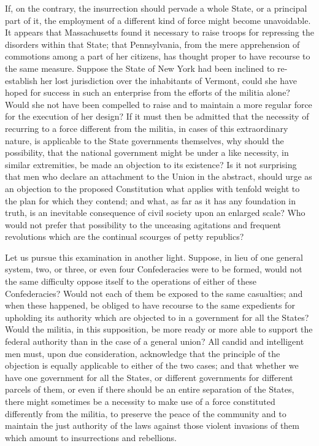 If, on the contrary, the insurrection should pervade a whole State, or a principal part of it, the employment of a different kind of force might become unavoidable. 
It appears that Massachusetts found it necessary to raise troops for repressing the disorders within that State; that Pennsylvania, from the mere apprehension of commotions among a part of her citizens, has thought proper to have recourse to the same measure. 
Suppose the State of New York had been inclined to re-establish her lost jurisdiction over the inhabitants of Vermont, could she have hoped for success in such an enterprise from the efforts of the militia alone? 
Would she not have been compelled to raise and to maintain a more regular force for the execution of her design? 
If it must then be admitted that the necessity of recurring to a force different from the militia, in cases of this extraordinary nature, is applicable to the State governments themselves, why should the possibility, that the national government might be under a like necessity, in similar extremities, be made an objection to its existence? 
Is it not surprising that men who declare an attachment to the Union in the abstract, should urge as an objection to the proposed Constitution what applies with tenfold weight to the plan for which they contend; and what, as far as it has any foundation in truth, is an inevitable consequence of civil society upon an enlarged scale? 
Who would not prefer that possibility to the unceasing agitations and frequent revolutions which are the continual scourges of petty republics?

Let us pursue this examination in another light. 
Suppose, in lieu of one general system, two, or three, or even four Confederacies were to be formed, would not the same difficulty oppose itself to the operations of either of these Confederacies? 
Would not each of them be exposed to the same casualties; and when these happened, be obliged to have recourse to the same expedients for upholding its authority which are objected to in a government for all the States? 
Would the militia, in this supposition, be more ready or more able to support the federal authority than in the case of a general union? 
All candid and intelligent men must, upon due consideration, acknowledge that the principle of the objection is equally applicable to either of the two cases; and that whether we have one government for all the States, or different governments for different parcels of them, or even if there should be an entire separation of the States, there might sometimes be a necessity to make use of a force constituted differently from the militia, to preserve the peace of the community and to maintain the just authority of the laws against those violent invasions of them which amount to insurrections and rebellions.

